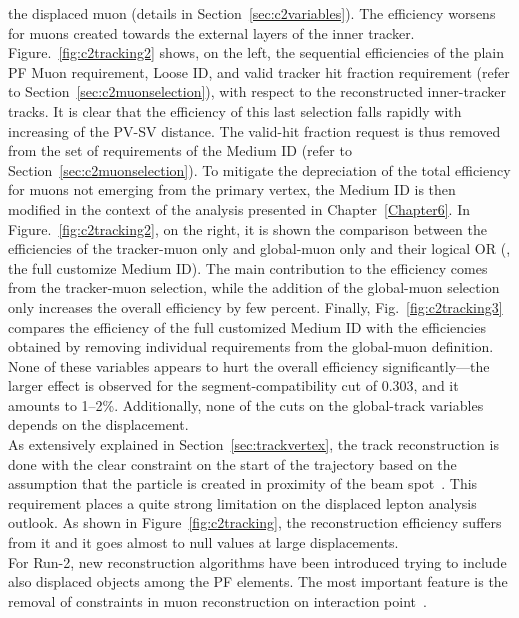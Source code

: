  the
displaced muon (details in Section~\ref{sec:c2variables}). The efficiency worsens for muons created towards the external layers of the inner
tracker.
Figure.~\ref{fig:c2tracking2} shows, on the left, the sequential
efficiencies of the plain PF Muon requirement,
Loose ID, and
valid tracker hit fraction requirement (refer to Section~\ref{sec:c2muonselection}), with respect to the reconstructed
inner-tracker tracks. It is clear that the efficiency of
this last selection 
falls rapidly with increasing of the PV-SV
distance. 
The valid-hit fraction request is thus removed from the set of
requirements of the Medium ID (refer to Section~\ref{sec:c2muonselection}). To mitigate the depreciation of the
total efficiency for muons not emerging from the primary vertex, the
Medium ID is then modified in the context of the analysis presented in
Chapter~\ref{Chapter6}. In Figure.~\ref{fig:c2tracking2}, on the
right, it is shown
the comparison between the efficiencies of the
tracker-muon only and global-muon only and their logical OR (\ie, the full
customize Medium ID). The main contribution to the efficiency comes
from the tracker-muon selection, while the addition of the global-muon
selection only increases the overall efficiency by few percent. Finally, Fig.~\ref{fig:c2tracking3} compares the efficiency of
the full customized Medium ID with the efficiencies obtained by removing
individual requirements from the global-muon definition. None of these variables
appears to hurt the overall efficiency significantly---the larger
effect is observed for the segment-compatibility cut of 0.303, and it
amounts to 1--2\%. Additionally, none of the cuts on the global-track
variables depends on the displacement.\\

As extensively explained in Section~\ref{sec:trackvertex}, the track
reconstruction is done with the clear 
constraint on the start of the trajectory based on the assumption that the
particle is created in proximity of the beam
spot~\cite{Collaboration_2014_tracking}. This requirement places a
quite strong limitation on the displaced lepton analysis outlook. As
shown in Figure~\ref{fig:c2tracking}, the reconstruction efficiency
suffers from it and it goes almost to null values at large
displacements. \\
For Run-2, new reconstruction algorithms have been
introduced trying to include also displaced objects among
the PF elements. The most important feature is the removal of constraints in muon reconstruction
on interaction point~\cite{CMS-DP-2015-015, steven_slide}.

